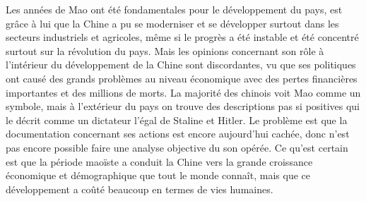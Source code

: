 Les années de Mao ont été fondamentales pour le développement du pays, est grâce à lui que la Chine a pu se moderniser et se développer surtout dans les secteurs industriels et agricoles, même si le progrès a été instable et été concentré surtout sur la révolution du pays.  Mais les opinions concernant son rôle à l’intérieur du développement de la Chine sont discordantes, vu que ses politiques ont causé des grands problèmes au niveau économique avec des pertes financières importantes et des millions de morts.  La majorité des chinois voit Mao comme un symbole, mais à l’extérieur du pays on trouve des descriptions pas si positives qui le décrit comme un dictateur l’égal de Staline et Hitler. Le problème est que la documentation concernant ses actions est encore aujourd’hui cachée, donc n’est pas encore possible faire une analyse objective du son opérée. Ce qu’est certain est que la période maoïste a conduit la Chine vers la grande croissance économique et démographique que tout le monde connaît, mais que ce développement a coûté beaucoup en termes de vies humaines. 

